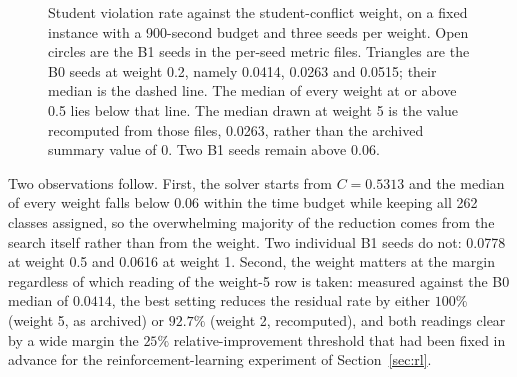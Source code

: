 \documentclass[journal]{IEEEtran}
\begin{document}
\begin{figure}[t]
\centering
{}
\caption{Student violation rate against the student-conflict weight, on a fixed instance with a 900-second budget and three seeds per weight. Open circles are the B1 seeds in the per-seed metric files. Triangles are the B0 seeds at weight 0.2, namely 0.0414, 0.0263 and 0.0515; their median is the dashed line. The median of every weight at or above 0.5 lies below that line. The median drawn at weight 5 is the value recomputed from those files, 0.0263, rather than the archived summary value of 0. Two B1 seeds remain above 0.06.}
\label{fig:sweep}
\end{figure}

Two observations follow. First, the solver starts from $C=0.5313$ and the median of every weight falls below $0.06$ within the time budget while keeping all 262 classes assigned, so the overwhelming majority of the reduction comes from the search itself rather than from the weight. Two individual B1 seeds do not: 0.0778 at weight 0.5 and 0.0616 at weight 1. Second, the weight matters at the margin regardless of which reading of the weight-5 row is taken: measured against the B0 median of $0.0414$, the best setting reduces the residual rate by either $100\%$ (weight 5, as archived) or $92.7\%$ (weight 2, recomputed), and both readings clear by a wide margin the $25\%$ relative-improvement threshold that had been fixed in advance for the reinforcement-learning experiment of Section~\ref{sec:rl}.
\end{document}
